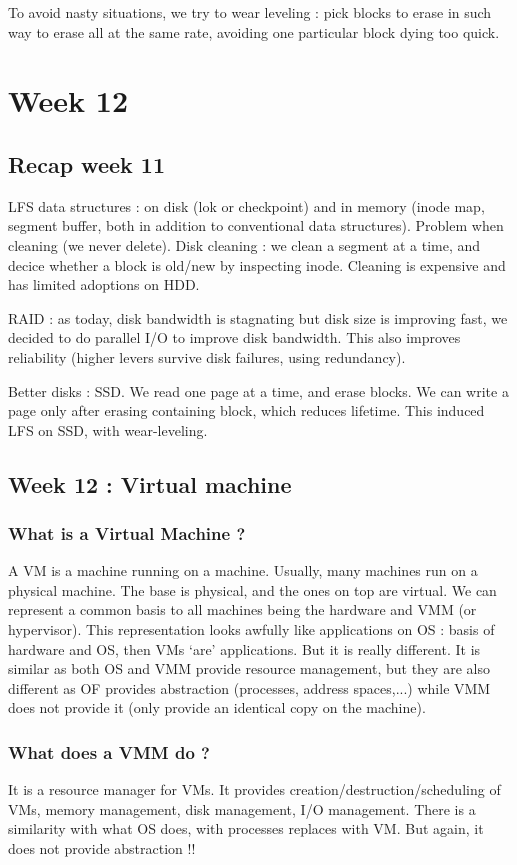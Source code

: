 \documentclass[12pt,a4paper]{article}
\begin{document}
To avoid nasty situations, we try to wear leveling : pick blocks to erase in such way to erase all at the same rate, avoiding one particular block dying too quick. 	

\section{Week 12}
\subsection{Recap week 11}
LFS data structures : on disk (lok or checkpoint) and in memory (inode map, segment buffer, both in addition to conventional data structures). Problem when cleaning (we never delete). Disk cleaning : we clean a segment at a time, and decice whether a block is old/new by inspecting inode. Cleaning is expensive and has limited adoptions on HDD.

RAID : as today, disk bandwidth is stagnating but disk size is improving fast, we decided to do parallel I/O to improve disk bandwidth. This also improves reliability (higher levers survive disk failures, using redundancy). 

Better disks : SSD. We read one page at a time, and erase blocks. We can write a page only after erasing containing block, which reduces lifetime. This induced LFS on SSD, with wear-leveling. 
\subsection{Week 12 : Virtual machine}
\subsubsection{What is a Virtual Machine ?}
A VM is a machine running on a machine. Usually, many machines run on a physical machine. The base is physical, and the ones on top are virtual. We can represent a common basis to all machines being the hardware and VMM (or hypervisor). This representation looks awfully like applications on OS : basis of hardware and OS, then VMs `are' applications. But it is really different. It is similar as both OS and VMM provide resource management, but they are also different as OF provides abstraction (processes, address spaces,...) while VMM does not provide it (only provide an identical copy on the machine).
\subsubsection{What does a VMM do ?}
It is a resource manager for VMs. It provides creation/destruction/scheduling of VMs, memory management, disk management, I/O management. There is a similarity with what OS does, with processes replaces with VM. But again, it does not provide abstraction !!
\end{document}
